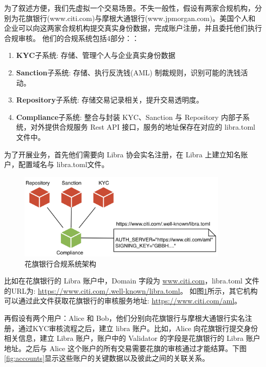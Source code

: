 为了叙述方便，我们先虚拟一个交易场景。不失一般性，假设有两家合规机构，分别为花旗银行(www.citi.com)与摩根大通银行(www.jpmorgan.com)。美国个人和企业可以向这两家合规机构提交真实身份数据，完成账户注册，并且委托他们执行合规审核。
他们的合规系统包括4部分：：
\begin{enumerate}
    \item \textbf{KYC}子系统:      存储、管理个人与企业真实身份数据
    \item \textbf{Sanction}子系统: 存储、执行反洗钱(AML) 制裁规则，识别可能的洗钱活动。
    \item \textbf{Repository}子系统: 存储交易记录相关，提升交易透明度。
    \item \textbf{Compliance}子系统: 整合与封装 KYC、Sanction 与 Repository 内部子系统，对外提供合规服务 Rest API 接口，服务的地址保存在对应的 libra.toml 文件中。
\end{enumerate}

为了开展业务，首先他们需要向 Libra 协会实名注册，在 Libra 上建立知名账户，配置域名与 libra.toml文件。

\begin{figure}[h!]
    \centering
    \includegraphics[width=10cm, keepaspectratio]{images/citi.png}
    \caption{花旗银行合规系统架构}
    \label{fig:citi}
\end{figure}


比如在花旗银行的 Libra 账户中，Domain 字段为 \url{www.citi.com}，libra.toml 文件的URL为: \url{https://www.citi.com/.well-known/libra.toml}。
如图\ref{fig:citi}所示，其它机构可以通过此文件获取花旗银行的审核服务地址: \url{https://www.citi.com/aml}。

再假设有两个用户：Alice 和 Bob，他们分别向花旗银行与摩根大通银行实名注册，通过KYC审核流程之后，建立 libra 账户。比如，Alice 向花旗银行提交身份相关信息，建立 Libra 账户，账户中的 Validator 的字段是花旗银行的 Libra 账户地址。之后与 Alice 这个账户的所有交易需要花旗的审核通过才能结算。下图\ref{fig:accounts}显示这些账户的关键数据以及彼此之间的关联关系。

